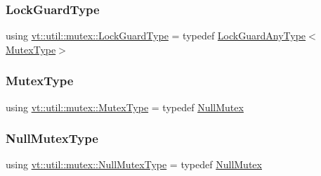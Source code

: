 \mbox{\label{namespacevt_1_1util_1_1mutex_a06a2c6944076fefe1b753e8eff4c58bd}} 
\subsubsection{\texorpdfstring{Lock\+Guard\+Type}{LockGuardType}}
{\footnotesize\ttfamily using \hyperlink{namespacevt_1_1util_1_1mutex_a06a2c6944076fefe1b753e8eff4c58bd}{vt\+::util\+::mutex\+::\+Lock\+Guard\+Type} = typedef \hyperlink{namespacevt_1_1util_1_1mutex_ae88ee37c8846b0738a5137f96f912394}{Lock\+Guard\+Any\+Type}$<$\hyperlink{namespacevt_1_1util_1_1mutex_a891571f52e1bcf9eca62d0c2d0862a17}{Mutex\+Type}$>$}

\mbox{\label{namespacevt_1_1util_1_1mutex_a891571f52e1bcf9eca62d0c2d0862a17}} 
\subsubsection{\texorpdfstring{Mutex\+Type}{MutexType}}
{\footnotesize\ttfamily using \hyperlink{namespacevt_1_1util_1_1mutex_a891571f52e1bcf9eca62d0c2d0862a17}{vt\+::util\+::mutex\+::\+Mutex\+Type} = typedef \hyperlink{structvt_1_1util_1_1mutex_1_1_null_mutex}{Null\+Mutex}}

\mbox{\label{namespacevt_1_1util_1_1mutex_a92b4648d6c680ec378e4f36ac5af414a}} 
\subsubsection{\texorpdfstring{Null\+Mutex\+Type}{NullMutexType}}
{\footnotesize\ttfamily using \hyperlink{namespacevt_1_1util_1_1mutex_a92b4648d6c680ec378e4f36ac5af414a}{vt\+::util\+::mutex\+::\+Null\+Mutex\+Type} = typedef \hyperlink{structvt_1_1util_1_1mutex_1_1_null_mutex}{Null\+Mutex}}

